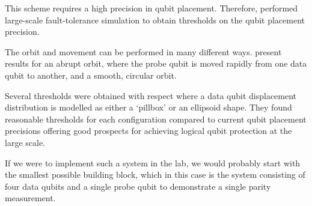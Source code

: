 This scheme requires a high precision in qubit placement. Therefore, \citet{OGorman2016} performed large-scale fault-tolerance simulation to obtain thresholds on the qubit placement precision.

The orbit and movement can be performed in many different ways. \citet{OGorman2016} present results for an abrupt orbit, where the probe qubit is moved rapidly from one data qubit to another, and a smooth, circular orbit.

Several thresholds were obtained with respect where a data qubit displacement distribution is modelled as either a `pillbox' or an ellipsoid shape.
They found reasonable thresholds for each configuration compared to current qubit placement precisions offering good prospects for achieving logical qubit protection at the large scale. 

If we were to implement such a system in the lab, we would probably start with the smallest possible building block, which in this case is the system consisting of four data qubits and a single probe qubit to demonstrate a single parity measurement.
